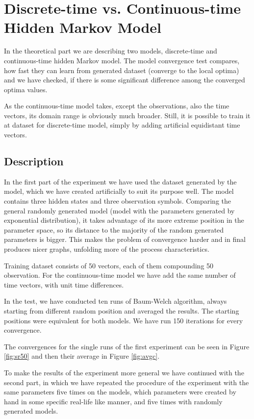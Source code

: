 \documentclass[thesis=M,english]{FITthesis}[2012/10/20]
\begin{document}
\section{Discrete-time vs. Continuous-time Hidden Markov Model}

In the theoretical part we are describing two models, discrete-time and continuous-time hidden Markov model. The model convergence test compares, how fast they can learn from generated dataset (converge to the local optima) and we have checked, if there is some significant difference among the converged optima values. 

As the continuous-time model takes, except the observations, also the time vectors, its domain range is obviously much broader. Still, it is possible to train it at dataset for discrete-time model, simply by adding artificial equidistant time vectors.

\subsection*{ Description }

In the first part of the experiment we have used the dataset generated by the model, which we have created artificially to suit its purpose well. 
The model contains three hidden states and three observation symbols. Comparing the general randomly generated model (model with the parameters generated by exponential distribution), it takes advantage of its more extreme position in the parameter space, so its distance to the majority of the random generated parameters is bigger. This makes the problem of convergence harder and in final produces nicer graphs, unfolding more of the process characteristics.

Training dataset consists of 50 vectors, each of them compounding 50 observation. For the continuous-time model we have add the same number of time vectors, with unit time differences.

In the test, we have conducted ten runs of Baum-Welch algorithm, always starting from different random position and averaged the results. The starting positions were equivalent for both models. We have run 150 iterations for every convergence.

The convergences for the single runs of the first experiment can be seen in Figure \ref{fig:sr50} and then their average in Figure \ref{fig:avgc}.

To make the results of the experiment more general we have continued with the second part, in which we have repeated the procedure of the experiment with the same parameters five times on the models, which parameters were created by hand in some specific real-life like manner, and five times with randomly generated models.
\end{document}
